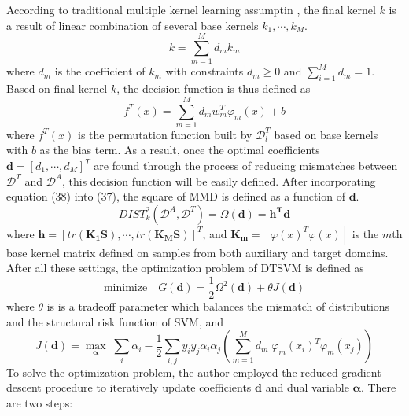 \noindent According to traditional multiple kernel learning assumptin \cite{lanckriet2004learning}, the final kernel $k$ is a result of linear combination of several base kernels $k_1, \cdots, k_M$.
\begin{equation}
k = \sum_{m=1}^{M}d_m k_m
\end{equation}
where $d_m$ is the coefficient of $k_m$ with constraints $d_m \geq 0$ and $\sum_{i=1}^{M}d_m = 1$. Based on final kernel $k$, the decision function is thus defined as
\begin{equation}
f^T(x) = \sum_{m=1}^{M} d_m w_m^T \varphi_m(x) + b 
\end{equation}
where $f^T(x)$ is the permutation function built by $\mathcal{D}_l^T$ based on base kernels with $b$ as the bias term. As a result, once the optimal coefficients $\mathbf{d}=[d_1, \cdots, d_M]^T$ are found through the process of reducing mismatches between $\mathcal{D}^T$ and $\mathcal{D}^A$, this decision function will be easily defined. After incorporating equation (38) into (37), the square of MMD is defined as a function of $\mathbf{d}$.
\begin{equation}
DIST_k^2(\mathcal{D}^A, \mathcal{D}^T) = \Omega(\mathbf{d}) = \mathbf{h^T d}
\end{equation}
where $\mathbf{h} = [tr(\mathbf{K_1 S}), \cdots, tr(\mathbf{K_MS})]^T$, and $\mathbf{K_m} = [\varphi(x)^T \varphi(x)]$ is the $m$th base kernel matrix defined on samples from both auxiliary and target domains. After all these settings, the optimization problem of DTSVM is defined as 
\begin{equation}
\text{minimize} \quad G(\mathbf{d}) = \frac{1}{2} \Omega^2(\mathbf{d}) + \theta J(\mathbf{d})
\end{equation}
where $\theta$ is is a tradeoff parameter which balances the mismatch of distributions and the structural risk function of SVM, and 
  \begin{equation}
  J(\mathbf{d}) = \underset{\boldsymbol{\alpha}}{\max} \; \sum_i \alpha_i - \frac{1}{2} \sum_{i,j} y_i y_j \alpha_i \alpha_j  (\sum_{m=1}^M d_m \; \varphi_m (x_i) ^T \varphi_m (x_j))           
  \end{equation}
To solve the optimization problem, the author \cite{duan2009domain} employed the reduced gradient descent procedure to iteratively update coefficients $\mathbf{d}$ and dual variable $\boldsymbol{\alpha}$. There are two steps:
